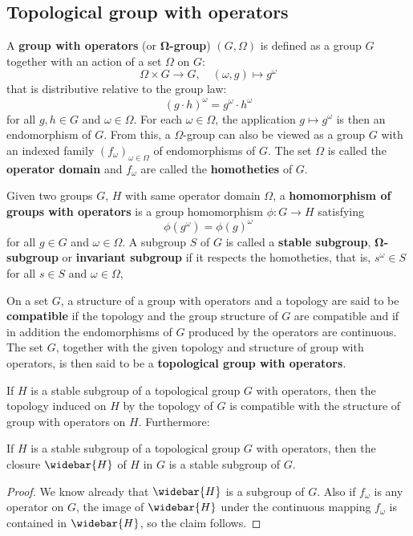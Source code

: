 \subsection{Topological group with operators}
A \textbf{group with operators} (or \textbf{$\bm{\Omega}$-group}) $(G,\Omega)$ is defined as a group $G$ together with an action of a set $\Omega$ on $G$:
\[\Omega\times G\to G,\quad (\omega,g)\mapsto g^\omega\]
that is distributive relative to the group law:
\[(g\cdot h)^\omega=g^\omega\cdot h^\omega\]
for all $g,h\in G$ and $\omega\in\Omega$. For each $\omega\in\Omega$, the application $g\mapsto g^\omega$ is then an endomorphism of $G$. From this, a $\Omega$-group can also be viewed as a group $G$ with an indexed family $(f_\omega)_{\omega\in\Omega}$ of endomorphisms of $G$. The set $\Omega$ is called the \textbf{operator domain} and $f_\omega$ are called the \textbf{homotheties} of $G$.\par
Given two groups $G$, $H$ with same operator domain $\Omega$, a \textbf{homomorphism of groups with operators} is a group homomorphism $\phi:G\to H$ satisfying
\[\phi(g^\omega)=\phi(g)^\omega\]
for all $g\in G$ and $\omega\in\Omega$. A subgroup $S$ of $G$ is called a \textbf{stable subgroup}, \textbf{$\bm{\Omega}$-subgroup} or \textbf{invariant subgroup} if it respects the homotheties, that is, $s^\omega\in S$ for all $s\in S$ and $\omega\in\Omega$,\par
On a set $G$, a structure of a group with operators and a topology are said to be \textbf{compatible} if the topology and the group structure of $G$ are compatible and if in addition the endomorphisms of $G$ produced by the operators are continuous. The set $G$, together with the given topology and structure of group with operators, is then said to be a \textbf{topological group with operators}.\par
If $H$ is a stable subgroup of a topological group $G$ with operators, then the topology induced on $H$ by the topology of $G$ is compatible with the structure of group with operators on $H$. Furthermore:
\begin{proposition}
If $H$ is a stable subgroup of a topological group $G$ with operators, then the closure $\widebar{H}$ of $H$ in $G$ is a stable subgroup of $G$.
\end{proposition}
\begin{proof}
We know already that $\widebar{H}$ is a subgroup of $G$. Also if $f_\omega$ is any operator on $G$, the image of $\widebar{H}$ under the continuous mapping $f_\omega$ is contained in $\widebar{H}$, so the claim follows.
\end{proof}
